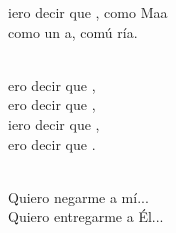 \begin{cancion}%
	iero decir que , como Maa  \\
	como  un a, comú ría. \\\jump\\
	\begin{chorus}%
	ero decir que ,  \\
	ero decir que , \\
	iero decir que , \\
	ero decir que . \\
	\end{chorus}%
	\jump\\
Quiero negarme a mí...\\
Quiero entregarme a Él...\\
\end{cancion}%
